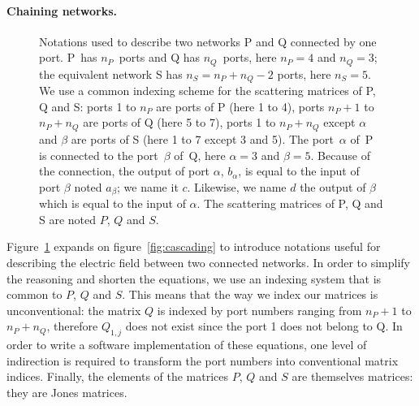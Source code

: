 \documentclass[a4paper,11pt]{article}
\begin{document}
\paragraph{Chaining networks.}
\begin{figure}[hbtp]
    \centering
    
    \caption{\label{fig:between_networks}
        Notations used to describe two networks P and Q connected by one port.
        P~has $n_P$~ports and Q has $n_Q$~ports, here $n_P=4$ and $n_Q=3$;
        the equivalent network S has $n_S = n_P + n_Q - 2$ ports, here $n_S=5$.
        We use a common indexing scheme for the scattering matrices of P, Q and S:
        ports 1 to $n_P$ are ports of P (here 1 to 4),
        ports $n_P+1$ to $n_P+n_Q$ are ports of Q (here 5 to 7),
        ports 1 to $n_P+n_Q$ except $\alpha$ and $\beta$ are ports of S (here 1 to 7 except 3 and 5).
        The port~$\alpha$ of~P is connected to the port~$\beta$ of~Q, here $\alpha=3$ and $\beta=5$.
        Because of the connection, the output of port $\alpha$, $b_\alpha$, is equal to the input of port $\beta$ noted $a_\beta$; we name it $c$.  Likewise, we name $d$ the output of $\beta$ which is equal to the input of $\alpha$.
        The scattering matrices of P, Q and S are noted $P$, $Q$ and $S$.
        }
\end{figure}
Figure~\ref{fig:between_networks} expands on figure~\ref{fig:cascading} to introduce notations useful for describing the electric field between two connected networks.
In order to simplify the reasoning and shorten the equations, we use an indexing system that is common to $P$, $Q$ and $S$.  This means that the way we index our matrices is unconventional: the matrix $Q$ is indexed by port numbers ranging from $n_P+1$ to $n_P + n_Q$, therefore $Q_{1, j}$ does not exist since the port 1 does not belong to Q.  In order to write a software implementation of these equations, one level of indirection is required to transform the port numbers into conventional matrix indices.
Finally, the elements of the matrices $P$, $Q$ and $S$ are themselves matrices: they are Jones matrices.
\end{document}
